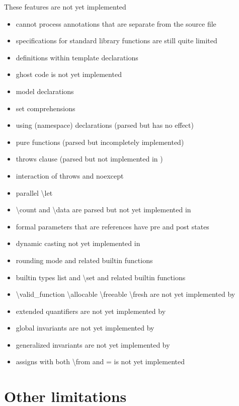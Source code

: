 These \acslpp features are not yet implemented
\begin{itemize}

\item \fclang cannot process annotations that are separate from the source file
\item \acslpp specifications for standard \cpp library functions are still quite limited
\item \acslpp definitions within template declarations
\item ghost code is not yet implemented
\item model declarations
\item set comprehensions
\item using (namespace) declarations (parsed but has no effect)
\item pure functions (parsed but incompletely implemented)
\item throws clause (parsed but not implemented in \framac)
\item interaction of throws and noexcept
\item parallel \textbackslash let
\item \textbackslash count and \textbackslash data are parsed but not yet implemented in \framac
\item formal parameters that are references have pre and post states
\item dynamic casting not yet implemented in \framac
\item rounding mode  and related builtin functions
\item builtin types list and \textbackslash set and related builtin functions
\item \textbackslash valid\_function \textbackslash allocable \textbackslash freeable \textbackslash fresh are not yet implemented by \framac
\item extended quantifiers are not yet implemented by \framac
\item global invariants are not yet implemented by \framac
\item generalized invariants are not yet implemented by \framac
\item assigns with both \textbackslash from and = is not yet implemented
\end{itemize}

\section{Other \fcl limitations}

